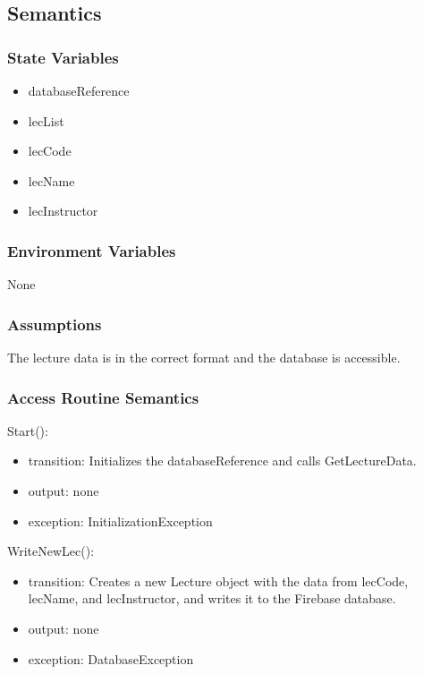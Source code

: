 \documentclass[12pt, titlepage]{article}
\begin{document}
\subsection{Semantics}

\subsubsection{State Variables}

\begin{itemize}
\item databaseReference
\item lecList
\item lecCode
\item lecName
\item lecInstructor
\end{itemize}

\subsubsection{Environment Variables}

None

\subsubsection{Assumptions}

The lecture data is in the correct format and the database is accessible.

\subsubsection{Access Routine Semantics}

\noindent Start():
\begin{itemize}
\item transition: Initializes the databaseReference and calls GetLectureData.
\item output: none
\item exception: InitializationException
\end{itemize}

\noindent WriteNewLec():
\begin{itemize}
\item transition: Creates a new Lecture object with the data from lecCode, lecName, and lecInstructor, and writes it to the Firebase database.
\item output: none
\item exception: DatabaseException
\end{itemize}
\end{document}
